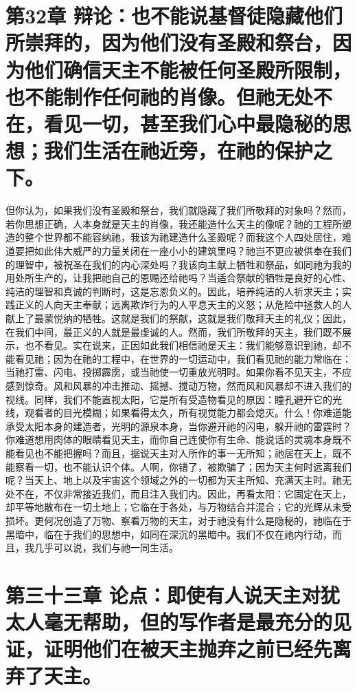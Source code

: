 
\section{第32章 辩论：也不能说基督徒隐藏他们所崇拜的，因为他们没有圣殿和祭台，因为他们确信天主不能被任何圣殿所限制，也不能制作任何祂的肖像。但祂无处不在，看见一切，甚至我们心中最隐秘的思想；我们生活在祂近旁，在祂的保护之下。}

但你认为，如果我们没有圣殿和祭台，我们就隐藏了我们所敬拜的对象吗？然而，若你思想正确，人本身就是天主的肖像，我还能造什么天主的像呢？祂的工程所塑造的整个世界都不能容纳祂，我该为祂建造什么圣殿呢？而我这个人四处居住，难道要把如此伟大威严的力量关闭在一座小小的建筑里吗？祂岂不更应被供奉在我们的理智中，被祝圣在我们的内心深处吗？我该向主献上牺牲和祭品，如同祂为我的用处所生产的，让我把祂自己的恩赐还给祂吗？当适合祭献的牺牲是良好的心性、纯洁的理智和真诚的判断时，这是忘恩负义的。因此，培养纯洁的人祈求天主；实践正义的人向天主奉献；远离欺诈行为的人平息天主的义怒；从危险中拯救人的人献上了最蒙悦纳的牺牲。这就是我们的祭献，这就是我们敬拜天主的礼仪；因此，在我们中间，最正义的人就是最虔诚的人。然而，我们所敬拜的天主，我们既不展示，也不看见。实在说来，正因如此我们相信祂是天主：我们能够意识到祂，却不能看见祂；因为在祂的工程中，在世界的一切运动中，我们看见祂的能力常临在：当祂打雷、闪电、投掷霹雳，或当祂使一切重放光明时。如果你看不见天主，不应感到惊奇。风和风暴的冲击推动、摇撼、搅动万物，然而风和风暴却不进入我们的视线。同样，我们不能直视太阳，它是所有受造物看见的原因：瞳孔避开它的光线，观看者的目光模糊；如果看得太久，所有视觉能力都会熄灭。什么！你难道能承受太阳本身的建造者，光明的源泉本身，当你避开祂的闪电，躲开祂的雷霆时？你难道想用肉体的眼睛看见天主，而你自己连使你有生命、能说话的灵魂本身既不能看见也不能把握吗？而且，据说天主对人所作的事一无所知；祂居在天上，既不能察看一切，也不能认识个体。人啊，你错了，被欺骗了；因为天主何时远离我们呢？当天上、地上以及宇宙这个领域之外的一切都为天主所知、充满天主时。祂无处不在，不仅非常接近我们，而且注入我们内。因此，再看太阳：它固定在天上，却平等地散布在一切土地上；它临在于各处，与万物结合并混合；它的光辉从未受损坏。更何况创造了万物、察看万物的天主，对于祂没有什么是隐秘的，祂临在于黑暗中，临在于我们的思想中，如同在深沉的黑暗中。我们不仅在祂内行动，而且，我几乎可以说，我们与祂一同生活。\par


\section{第三十三章 论点：即使有人说天主对犹太人毫无帮助，但的写作者是最充分的见证，证明他们在被天主抛弃之前已经先离弃了天主。}

